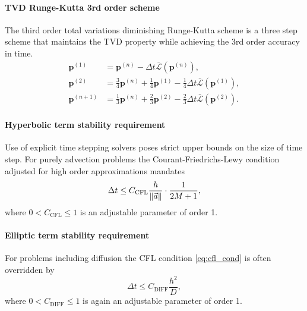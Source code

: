 \paragraph{TVD Runge-Kutta 3rd order scheme}
The third order total variations diminishing Runge-Kutta scheme \cite{Gottlieb2002}
is a three step scheme that maintains the TVD property while achieving the 3rd order
accuracy in time.
\begin{equation}
\begin{aligned}
\mathbf{p}^{(1)} &= \mathbf{p}^{(n)} - \Delta t
\bar{\mathcal{L}}(\mathbf{p}^{(n)}), \\
\mathbf{\mathbf{p}}^{(2)} &= \frac{3}{4}\mathbf{p}^{(n)}
+\frac{1}{4}\mathbf{p}^{(1)} - \frac{1}{4}\Delta t
\bar{\mathcal{L}}(\mathbf{p}^{(1)}),\\
\mathbf{p}^{(n+1)} &= \frac{1}{3}\mathbf{p}^{(n)}
+\frac{2}{3}\mathbf{p}^{(2)} - \frac{2}{3}\Delta t
\bar{\mathcal{L}}(\mathbf{p}^{(2)}).
\end{aligned}
\end{equation}


\paragraph{Hyperbolic term stability requirement}
Use of explicit time stepping solvers poses strict upper bounds on the size of time step.
For purely advection problems the Courant-Friedrichs-Lewy condition adjusted for high order
approximations mandates \cite[p. 5]{Chalons2018}
\begin{equation}
\label{eq:cfl_cond}
\Delta t \leq C_\mathrm{CFL}\frac{h}{\left\lVert\vec{a}\right\rVert} \cdot \frac{1}{2M + 1},
\end{equation}
where $0 < C_\mathrm{CFL} \leq 1$ is an adjustable parameter of order 1.


\paragraph{Elliptic term stability requirement}
For problems including diffusion the CFL condition \eqref{eq:cfl_cond} is often
overridden by \cite{Hesthaven2008}
\begin{equation}
\Delta t \leq C_\mathrm{DIFF}\frac{h^2}{D}, %
\end{equation}
where $0 < C_\mathrm{DIFF} \leq 1$ is again an adjustable parameter of order 1.

\newpage
